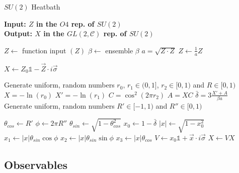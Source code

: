 \documentclass[a4paper,10pt]{article}
\begin{document}
\begin{algorithm}[H]
\caption{$SU(2)$ Heatbath}\label{alg:SU2HB}
\hspace*{\algorithmicindent} \textbf{Input: $Z$ in the $O4$ rep. of $SU(2)$} \\
\hspace*{\algorithmicindent} \textbf{Output: $X$ in the $GL(2,\mathcal{C})$ rep. of $SU(2)$}
\begin{algorithmic}
\Ensure
\State $Z \gets $ function input $(Z)$
\State $\beta \gets $ ensemble $\beta$
\State $a=\sqrt{Z\cdot Z}$
\State $Z \gets \frac{1}{a}Z$

\State $X \gets Z_0\mathbb{1}-\vec{Z}\cdot i\vec{\sigma}$

\State Generate uniform, random numbers $r_0,\,r_1 \in (0,1]$,  $r_2 \in [0,1)$ and $R \in [0,1)$
\State $X = -\operatorname{ln}(r_0)$
\State $X' = -\operatorname{ln}(r_1)$
\State $C = \cos^2\left( 2\pi r_2 \right)$
\State $A = XC$
\State $\bar{\delta} = 3\frac{X'+A}{\beta a}$
\EndWhile
\State Generate uniform, random numbers $R'\in [-1,1)$ and $R'' \in [0,1)$

\State $\theta_{cos} \gets R'$
\State $\phi \gets 2\pi R''$
\State $\theta_{sin} \gets \sqrt{1-\theta_{cos}^2}$
\State $x_0 \gets 1-\bar{\delta}$
\State $|x| \gets \sqrt{1-x_0^2}$
\State $x_1 \gets |x|\theta_{sin}\cos{\phi}$
\State $x_2 \gets |x|\theta_{sin}\sin{\phi}$
\State $x_3 \gets |x|\theta_{cos}$
\State $V \gets x_0\mathbb{1}+\vec{x}\cdot i\vec{\sigma}$
\State $X\gets VX$
\end{algorithmic}
\end{algorithm}

\subsection{Observables}
\end{document}
